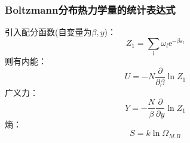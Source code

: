 \documentclass[12pt]{article}
\begin{document}
\subsubsection{Boltzmann分布热力学量的统计表达式}
\noindent
引入配分函数(自变量为$\beta, y$)：
\begin{equation}
	Z_1=\sum_{l} \omega_l \mathrm{e}^{-\beta \varepsilon_l}
\end{equation}
则有内能：
\begin{equation}
		U=-N\frac{\partial}{\partial \beta}\ln Z_1
		\label{x26}
	\end{equation}
广义力：
\begin{equation}
		Y=-\frac{N}{\beta}\frac{\partial}{\partial y}\ln Z_1
		\label{x27}
\end{equation}
熵：
	\begin{equation}
		S=k\ln \Omega_{M.B}
		\label{x28}
	\end{equation}
\end{document}
